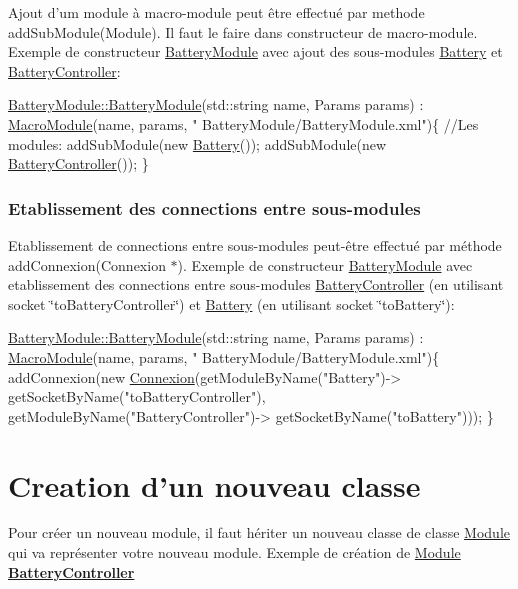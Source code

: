 Ajout d'um module à macro-\/module peut être effectué par methode {\ttfamily add\-Sub\-Module(\-Module)}. Il faut le faire dans constructeur de macro-\/module. Exemple de constructeur \hyperlink{classBatteryModule}{Battery\-Module} avec ajout des sous-\/modules \hyperlink{classBattery}{Battery} et \hyperlink{classBatteryController}{Battery\-Controller}\-: 
\begin{DoxyCode}
\hyperlink{classBatteryModule_a2fb494ef5f124c38c0fdf9ccfb31918f}{BatteryModule::BatteryModule}(std::string name, 
      Params params) : \hyperlink{classMacroModule}{MacroModule}(name, params, \textcolor{stringliteral}{"
      BatteryModule/BatteryModule.xml"})\{
    \textcolor{comment}{//Les modules:}
    addSubModule(\textcolor{keyword}{new} \hyperlink{classBattery}{Battery}());
    addSubModule(\textcolor{keyword}{new} \hyperlink{classBatteryController}{BatteryController}());        \}
\end{DoxyCode}
\hypertarget{R_xC3_xA9f_xC3_xA9rence_connectSubModules}{}\subsubsection{Etablissement des connections entre sous-\/modules}\label{R_xC3_xA9f_xC3_xA9rence_connectSubModules}
Etablissement de connections entre sous-\/modules peut-\/être effectué par méthode {\ttfamily add\-Connexion(\-Connexion $\ast$)}. Exemple de constructeur \hyperlink{classBatteryModule}{Battery\-Module} avec etablissement des connections entre sous-\/modules \hyperlink{classBatteryController}{Battery\-Controller} (en utilisant socket \char`\"{}to\-Battery\-Controller\char`\"{}) et \hyperlink{classBattery}{Battery} (en utilisant socket \char`\"{}to\-Battery\char`\"{})\-: 
\begin{DoxyCode}
\hyperlink{classBatteryModule_a2fb494ef5f124c38c0fdf9ccfb31918f}{BatteryModule::BatteryModule}(std::string name, 
      Params params) : \hyperlink{classMacroModule}{MacroModule}(name, params, \textcolor{stringliteral}{"
      BatteryModule/BatteryModule.xml"})\{
     addConnexion(\textcolor{keyword}{new} \hyperlink{classConnexion}{Connexion}(getModuleByName(\textcolor{stringliteral}{"Battery"})->
      getSocketByName(\textcolor{stringliteral}{"toBatteryController"}), getModuleByName(\textcolor{stringliteral}{"BatteryController"})->
      getSocketByName(\textcolor{stringliteral}{"toBattery"})));
\}
\end{DoxyCode}
\hypertarget{R_xC3_xA9f_xC3_xA9rence_classCreation}{}\section{Creation d'un nouveau classe}\label{R_xC3_xA9f_xC3_xA9rence_classCreation}
Pour créer un nouveau module, il faut hériter un nouveau classe de classe \hyperlink{classModule}{Module} qui va représenter votre nouveau module. Exemple de création de \hyperlink{classModule}{Module} {\bfseries \hyperlink{classBatteryController}{Battery\-Controller}}

